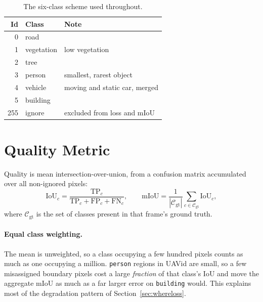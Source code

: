 \documentclass[report.tex]{subfiles}
\begin{document}
\begin{table}[t]
    \centering
    \caption[The six-class label scheme]{The six-class scheme used throughout.}
    \label{tab:classes}
    \footnotesize
    \begin{tabular}{@{}rll@{}}
        \toprule
        \textbf{Id} & \textbf{Class} & \textbf{Note} \\
        \midrule
        0   & road       & \\
        1   & vegetation & low vegetation \\
        2   & tree       & \\
        3   & person     & smallest, rarest object \\
        4   & vehicle    & moving and static car, merged \\
        5   & building   & \\
        255 & ignore     & excluded from loss and mIoU \\
        \bottomrule
    \end{tabular}
\end{table}

\section{Quality Metric}
\label{sec:metric}

Quality is mean intersection-over-union, from a confusion matrix accumulated
over all non-ignored pixels:
%
\begin{equation}
    \mathrm{IoU}_c = \frac{\mathrm{TP}_c}{\mathrm{TP}_c + \mathrm{FP}_c + \mathrm{FN}_c},
    \qquad
    \mathrm{mIoU} = \frac{1}{|\mathcal{C}_{\text{gt}}|} \sum_{c \in \mathcal{C}_{\text{gt}}} \mathrm{IoU}_c ,
\end{equation}
%
where $\mathcal{C}_{\text{gt}}$ is the set of classes present in that frame's
ground truth.

\paragraph{Equal class weighting.} The mean is unweighted, so a class
occupying a few hundred pixels counts as much as one occupying a million.
\texttt{person} regions in UAVid are small, so a few misassigned boundary
pixels cost a large \emph{fraction} of that class's IoU and move the aggregate
mIoU as much as a far larger error on \texttt{building} would. This explains
most of the degradation pattern of Section~\ref{sec:whereloss}.
\end{document}
